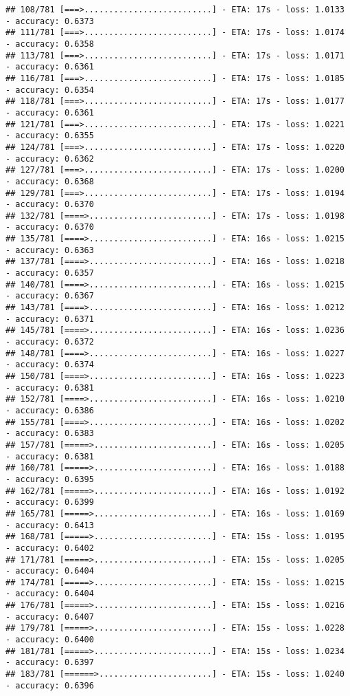 \documentclass[
]{article}
\begin{document}
\begin{verbatim}
## 108/781 [===>..........................] - ETA: 17s - loss: 1.0133 - accuracy: 0.6373
## 111/781 [===>..........................] - ETA: 17s - loss: 1.0174 - accuracy: 0.6358
## 113/781 [===>..........................] - ETA: 17s - loss: 1.0171 - accuracy: 0.6361
## 116/781 [===>..........................] - ETA: 17s - loss: 1.0185 - accuracy: 0.6354
## 118/781 [===>..........................] - ETA: 17s - loss: 1.0177 - accuracy: 0.6361
## 121/781 [===>..........................] - ETA: 17s - loss: 1.0221 - accuracy: 0.6355
## 124/781 [===>..........................] - ETA: 17s - loss: 1.0220 - accuracy: 0.6362
## 127/781 [===>..........................] - ETA: 17s - loss: 1.0200 - accuracy: 0.6368
## 129/781 [===>..........................] - ETA: 17s - loss: 1.0194 - accuracy: 0.6370
## 132/781 [====>.........................] - ETA: 17s - loss: 1.0198 - accuracy: 0.6370
## 135/781 [====>.........................] - ETA: 16s - loss: 1.0215 - accuracy: 0.6363
## 137/781 [====>.........................] - ETA: 16s - loss: 1.0218 - accuracy: 0.6357
## 140/781 [====>.........................] - ETA: 16s - loss: 1.0215 - accuracy: 0.6367
## 143/781 [====>.........................] - ETA: 16s - loss: 1.0212 - accuracy: 0.6371
## 145/781 [====>.........................] - ETA: 16s - loss: 1.0236 - accuracy: 0.6372
## 148/781 [====>.........................] - ETA: 16s - loss: 1.0227 - accuracy: 0.6374
## 150/781 [====>.........................] - ETA: 16s - loss: 1.0223 - accuracy: 0.6381
## 152/781 [====>.........................] - ETA: 16s - loss: 1.0210 - accuracy: 0.6386
## 155/781 [====>.........................] - ETA: 16s - loss: 1.0202 - accuracy: 0.6383
## 157/781 [=====>........................] - ETA: 16s - loss: 1.0205 - accuracy: 0.6381
## 160/781 [=====>........................] - ETA: 16s - loss: 1.0188 - accuracy: 0.6395
## 162/781 [=====>........................] - ETA: 16s - loss: 1.0192 - accuracy: 0.6399
## 165/781 [=====>........................] - ETA: 16s - loss: 1.0169 - accuracy: 0.6413
## 168/781 [=====>........................] - ETA: 15s - loss: 1.0195 - accuracy: 0.6402
## 171/781 [=====>........................] - ETA: 15s - loss: 1.0205 - accuracy: 0.6404
## 174/781 [=====>........................] - ETA: 15s - loss: 1.0215 - accuracy: 0.6404
## 176/781 [=====>........................] - ETA: 15s - loss: 1.0216 - accuracy: 0.6407
## 179/781 [=====>........................] - ETA: 15s - loss: 1.0228 - accuracy: 0.6400
## 181/781 [=====>........................] - ETA: 15s - loss: 1.0234 - accuracy: 0.6397
## 183/781 [======>.......................] - ETA: 15s - loss: 1.0240 - accuracy: 0.6396

\end{verbatim}
\end{document}
